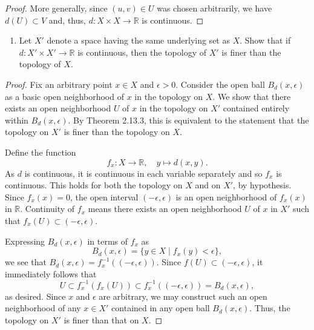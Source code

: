 \documentclass[a4paper,10pt]{article}
\newcommand{\inv}{^{-1}}
\newcommand{\RR}{\mathbb{R}}
\begin{document}
\begin{solution}
\begin{proof}
        More generally, since $(u, v) \in U$ was chosen arbitrarily, we have $d(U) \subset V$ and, thus, $d: X \times X \rightarrow \RR$ is continuous.
    \end{proof}
    \bigskip

    \begin{enumerate}[label={(\alph*)}, align=left, leftmargin=\parindent, listparindent=\parindent, labelwidth=0pt, itemindent=!]
        \addtocounter{enumi}{1} 
        \item Let $X'$ denote a space having the same underlying set as $X$.
        Show that if $d: X' \times X' \rightarrow \RR$ is continuous, then the topology of $X'$ is finer than the topology of $X$.
    \end{enumerate}
    \begin{proof}
        Fix an arbitrary point $x \in X$ and $\epsilon > 0$.
        Consider the open ball $B_d(x, \epsilon)$ as a basic open neighborhood of $x$ in the topology on $X$.
        We show that there exists an open neighborhood $U$ of $x$ in the topology on $X'$ contained entirely within $B_d(x, \epsilon)$.
        By Theorem 2.13.3, this is equivalent to the statement that the topology on $X'$ is finer than the topology on $X$.

        Define the function
        \begin{equation*}
            f_x: X \rightarrow \RR,\quad y \mapsto d(x, y).
        \end{equation*}
        As $d$ is continuous, it is continuous in each variable separately and so $f_x$ is continuous.
        This holds for both the topology on $X$ and on $X'$, by hypothesis.
        Since $f_x(x) = 0$, the open interval $(-\epsilon, \epsilon)$ is an open neighborhood of $f_x(x)$ in $\RR$.
        Continuity of $f_x$ means there exists an open neighborhood $U$ of $x$ in $X'$ such that $f_x(U) \subset (-\epsilon, \epsilon)$.

        Expressing $B_d(x, \epsilon)$ in terms of $f_x$ as
        \begin{equation*}
            B_d(x, \epsilon) = \{y \in X \mid f_x(y) < \epsilon\},
        \end{equation*}
        we see that $B_d(x, \epsilon) = f_x\inv((-\epsilon, \epsilon))$.
        Since $f(U) \subset (-\epsilon, \epsilon)$, it immediately follows that 
        \begin{equation*}
            U \subset f_x\inv(f_x(U)) \subset f_x\inv((-\epsilon, \epsilon)) = B_d(x, \epsilon),
        \end{equation*}
        as desired.
        Since $x$ and $\epsilon$ are arbitrary, we may construct such an open neighborhood of any $x \in X'$ contained in any open ball $B_d(x, \epsilon)$.
        Thus, the topology on $X'$ is finer than that on $X$.
    \end{proof}
\end{solution}
\newpage
\end{document}
